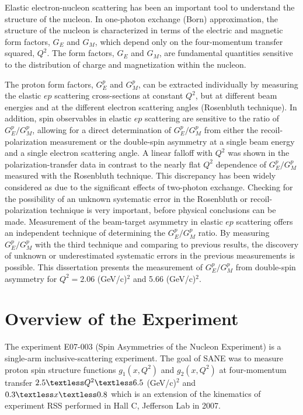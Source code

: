 Elastic electron-nucleon scattering has been an important tool to understand the structure of the nucleon. In one-photon exchange (Born) approximation, the structure of the nucleon is characterized in terms of the electric and magnetic form factors, $G_E$ and $G_M$, which depend only on the four-momentum transfer squared, $Q^2$. The form factors, $G_E$ and $G_M$, are fundamental quantities sensitive to the distribution of charge and magnetization within the nucleon.

The proton form factors,  $G_E^p$ and $G_M^p$, can be extracted individually by measuring the elastic $ep$ scattering cross-sections at constant $Q^2$, but at different beam energies and at the different electron scattering angles (Rosenbluth technique). In addition, spin observables in elastic $ep$ scattering are sensitive to the ratio of $G_E^p/G_M^p$, allowing for a direct determination of $G_E^p/G_M^p$ from either the recoil-polarization measurement or the double-spin asymmetry at a single beam energy and a single electron scattering angle. A linear falloff with $Q^2$ was shown in the polarization-transfer data in contrast to the nearly flat $Q^2$ dependence of $G_E^p/G_M^p$ measured with the Rosenbluth technique. This discrepancy has been widely considered as due to the significant effects of two-photon exchange. Checking for the possibility of an unknown systematic error in the Rosenbluth or recoil-polarization technique is very important, before physical conclusions can be made. Measurement of the beam-target asymmetry in elastic $ep$ scattering offers an independent technique of determining the $G_E^p/G_M^p$ ratio. By measuring $G_E^p/G_M^p$ with the third technique and comparing to previous results, the discovery of unknown or underestimated systematic errors in the previous measurements is possible. This dissertation presents the measurement of $G_E^p/G_M^p$ from double-spin asymmetry for $Q^2=2.06$ (GeV/c)$^2$ and 5.66 (GeV/c)$^2$.

\section{Overview of the Experiment}

The experiment E07-003 (Spin Asymmetries of the Nucleon Experiment) is a single-arm inclusive-scattering experiment. The goal of SANE was to measure proton spin structure functions $g_1(x, Q^2)$ and $g_2(x, Q^2)$ at four-momentum transfer $2.5\textless Q^2 \textless 6.5$ (GeV/c)$^2$ and $0.3 \textless x \textless 0.8$ which is an extension of the kinematics of experiment RSS \cite{179} performed in Hall C, Jefferson Lab in 2007. 

